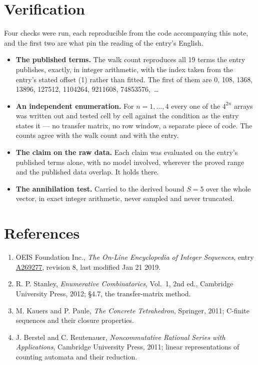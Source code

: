 \documentclass[11pt]{article}
\theoremstyle{definition}
\begin{document}
\section{Verification}

Four checks were run, each reproducible from the code accompanying this note, and the first two are what pin the reading of the entry's English.

\begin{itemize}

\item {\bfseries The published terms.} The walk count reproduces all 19 terms the entry publishes, exactly, in integer arithmetic, with the index taken from the entry's stated offset (1) rather than fitted. The first of them are 0, 108, 1368, 13896, 127512, 1104264, 9211608, 74853576,~\dots

\item {\bfseries An independent enumeration.} For $n = 1,\dots,4$ every one of the $4^{2n}$ arrays was written out and tested cell by cell against the condition as the entry states it --- no transfer matrix, no row window, a separate piece of code. The counts agree with the walk count and with the entry.

\item {\bfseries The claim on the raw data.} Each claim was evaluated on the entry's published terms alone, with no model involved, wherever the proved range and the published data overlap. It holds there.

\item {\bfseries The annihilation test.} Carried to the derived bound $S = 5$ over the whole vector, in exact integer arithmetic, never sampled and never truncated.

\end{itemize}

\section{References}

\begin{enumerate}

\item OEIS Foundation Inc., \emph{The On-Line Encyclopedia of Integer Sequences}, entry \href{https://oeis.org/A269277}{A269277}, revision 8, last modified Jan 21 2019.

\item R. P. Stanley, \emph{Enumerative Combinatorics}, Vol.~1, 2nd ed., Cambridge University Press, 2012; \S4.7, the transfer-matrix method.

\item M. Kauers and P. Paule, \emph{The Concrete Tetrahedron}, Springer, 2011; C-finite sequences and their closure properties.

\item J. Berstel and C. Reutenauer, \emph{Noncommutative Rational Series with Applications}, Cambridge University Press, 2011; linear representations of counting automata and their reduction.

\end{enumerate}
\end{document}
